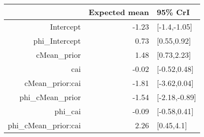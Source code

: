 \begin{tabular}{rrl}
  \hline
 & Expected mean & 95\% CrI \\ 
  \hline
Intercept & -1.23 & [-1.4,-1.05] \\ 
  phi\_Intercept & 0.73 & [0.55,0.92] \\ 
  cMean\_prior & 1.48 & [0.73,2.23] \\ 
  cai & -0.02 & [-0.52,0.48] \\ 
  cMean\_prior:cai & -1.81 & [-3.62,0.04] \\ 
  phi\_cMean\_prior & -1.54 & [-2.18,-0.89] \\ 
  phi\_cai & -0.09 & [-0.58,0.41] \\ 
  phi\_cMean\_prior:cai & 2.26 & [0.45,4.1] \\ 
   \hline
\end{tabular}

